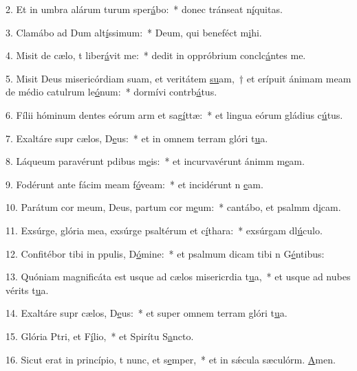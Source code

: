 2. Et in umbra alárum turum sper\uline{á}bo:~* donec tránseat n\uline{í}quitas.\par 
3. Clamábo ad Dum alt\uline{í}ssimum:~* Deum, qui beneféct m\uline{i}hi.\par 
4. Misit de cælo, t liber\uline{á}vit me:~* dedit in oppróbrium conclc\uline{á}ntes me.\par 
5. Misit Deus misericórdiam suam, et veritátem \uline{su}am,~† et erípuit ánimam meam de médio catulrum le\uline{ó}num:~* dormívi contrb\uline{á}tus.\par 
6. Fílii hóminum dentes eórum arm et sag\uline{í}ttæ:~* et lingua eórum gládius c\uline{ú}tus.\par 
7. Exaltáre supr cælos, D\uline{e}us:~* et in omnem terram glóri t\uline{u}a.\par 
8. Láqueum paravérunt pdibus m\uline{e}is:~* et incurvavérunt ánimm m\uline{e}am.\par 
9. Fodérunt ante fácim meam f\uline{ó}veam:~* et incidérunt n \uline{e}am.\par 
10. Parátum cor meum, Deus, partum cor m\uline{e}um:~* cantábo, et psalmm d\uline{i}cam.\par 
11. Exsúrge, glória mea, exsúrge psaltérum et c\uline{í}thara:~* exsúrgam dl\uline{ú}culo.\par 
12. Confitébor tibi in ppulis, D\uline{ó}mine:~* et psalmum dicam tibi n G\uline{é}ntibus:\par 
13. Quóniam magnificáta est usque ad cælos misericrdia t\uline{u}a,~* et usque ad nubes vérits t\uline{u}a.\par 
14. Exaltáre supr cælos, D\uline{e}us:~* et super omnem terram glóri t\uline{u}a.\par 
15. Glória Ptri, et F\uline{í}lio,~* et Spirítu S\uline{a}ncto.\par 
16. Sicut erat in princípio, t nunc, et s\uline{e}mper,~* et in sǽcula sæculórm. \uline{A}men.\par 
